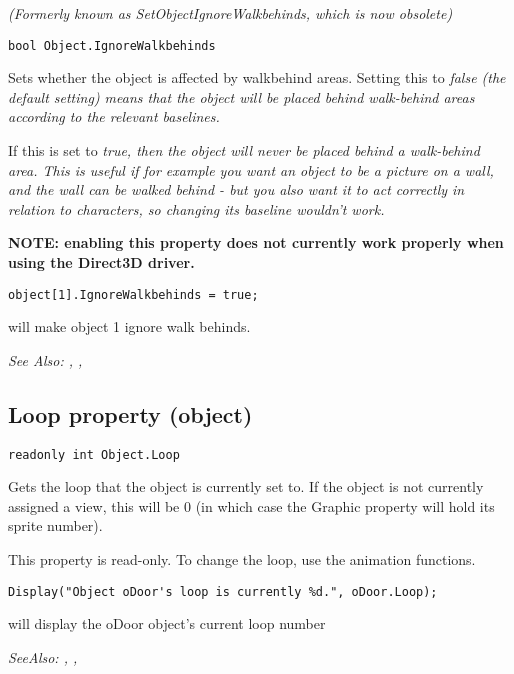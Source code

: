 \it{(Formerly known as SetObjectIgnoreWalkbehinds, which is now obsolete)}

\begin{verbatim}
bool Object.IgnoreWalkbehinds
\end{verbatim}
Sets whether the object is affected by walkbehind areas. Setting this to \it{false}
(the default setting) means that the object will be placed behind walk-behind
areas according to the relevant baselines.

If this is set to \it{true}, then the object will never be placed behind a walk-behind
area. This is useful if for example you want an object to be a picture on
a wall, and the wall can be walked behind - but you also want it to act
correctly in relation to characters, so changing its baseline wouldn't work.

\bf{NOTE:} enabling this property does not currently work properly when using
the Direct3D driver.

\begin{verbatim}
object[1].IgnoreWalkbehinds = true;
\end{verbatim}
will make object 1 ignore walk behinds.


\it{See Also:} ,
, 


\subsection{Loop property (object)}\label{Object.Loop}%

\begin{verbatim}
readonly int Object.Loop
\end{verbatim}
Gets the loop that the object is currently set to. If the object is not currently
assigned a view, this will be 0 (in which case the Graphic property will
hold its sprite number).

This property is read-only. To change the loop, use the animation functions.

\begin{verbatim}
Display("Object oDoor's loop is currently %d.", oDoor.Loop);
\end{verbatim}
will display the oDoor object's current loop number

\it{SeeAlso:} ,
,


